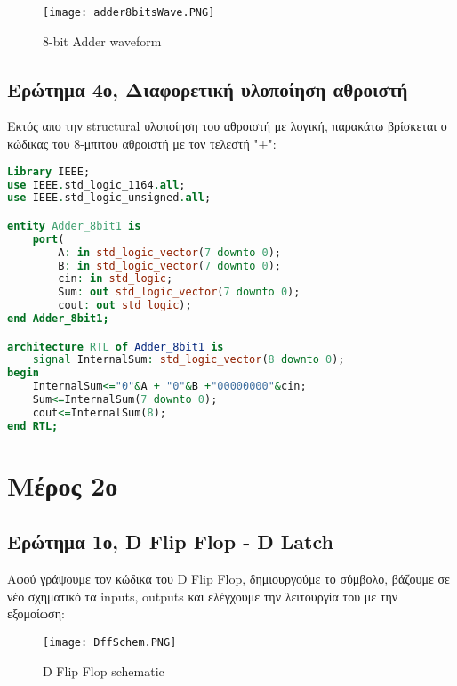 \documentclass{article}
\begin{document}
\begin{figure}[h!]
  \caption{\foreignlanguage{english}{8-bit Adder waveform}}
\texttt{[image: adder8bitsWave.PNG]}
\end{figure}


\subsection{Ερώτημα 4ο, Διαφορετική υλοποίηση αθροιστή}

Εκτός απο την \foreignlanguage{english}{structural} υλοποίηση του αθροιστή με λογική, παρακάτω βρίσκεται ο κώδικας του 8-μπιτου αθροιστή με τον τελεστή "$+$":

\begin{otherlanguage}{english}
\begin{lstlisting}[language=VHDL, caption= 8-bit Adder]
Library IEEE;
use IEEE.std_logic_1164.all;
use IEEE.std_logic_unsigned.all;

entity Adder_8bit1 is
	port(
		A: in std_logic_vector(7 downto 0);
		B: in std_logic_vector(7 downto 0);
		cin: in std_logic;
		Sum: out std_logic_vector(7 downto 0);
		cout: out std_logic);
end Adder_8bit1;

architecture RTL of Adder_8bit1 is
	signal InternalSum: std_logic_vector(8 downto 0);
begin
	InternalSum<="0"&A + "0"&B +"00000000"&cin;
	Sum<=InternalSum(7 downto 0);
	cout<=InternalSum(8);
end RTL;
\end{lstlisting}
\end{otherlanguage}

\clearpage

\section{Μέρος 2ο}


\subsection{Ερώτημα 1ο, \foreignlanguage{english}{D Flip Flop - D Latch}}

Αφού γράψουμε τον κώδικα του \foreignlanguage{english}{D Flip Flop}, δημιουργούμε το σύμβολο, βάζουμε σε νέο σχηματικό τα \foreignlanguage{english}{inputs, outputs} και ελέγχουμε την λειτουργία του με την εξομοίωση:

\begin{figure}[h!]
  \caption{\foreignlanguage{english}{D Flip Flop schematic}}
\texttt{[image: DffSchem.PNG]} 
\end{figure}
\end{document}
